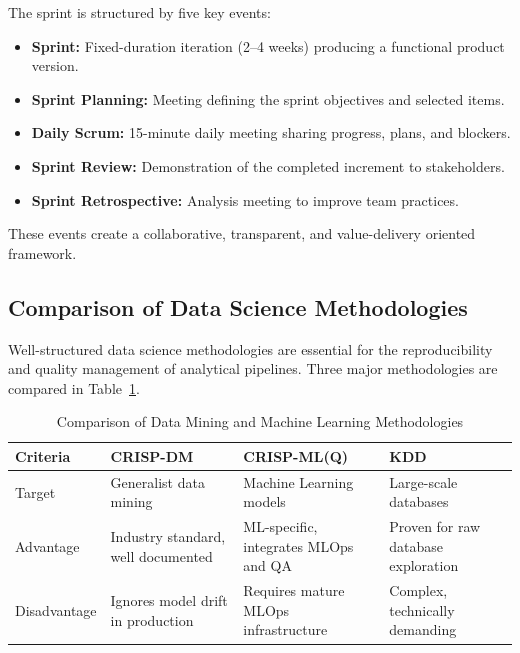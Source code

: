 The sprint is structured by five key events:

\begin{itemize}
    \item \textbf{Sprint:} Fixed-duration iteration (2--4 weeks) producing a functional
    product version.

    \item \textbf{Sprint Planning:} Meeting defining the sprint objectives and selected items.

    \item \textbf{Daily Scrum:} 15-minute daily meeting sharing progress, plans, and blockers.

    \item \textbf{Sprint Review:} Demonstration of the completed increment to stakeholders.

    \item \textbf{Sprint Retrospective:} Analysis meeting to improve team practices.
\end{itemize}

These events create a collaborative, transparent, and value-delivery oriented framework.

\subsection{Comparison of Data Science Methodologies}

Well-structured data science methodologies are essential for the reproducibility and quality
management of analytical pipelines. Three major methodologies are compared in
Table~\ref{tab:comparaison_data_sciences}.

\begin{table}[H]
\small
\centering
\caption{Comparison of Data Mining and Machine Learning Methodologies}
\label{tab:comparaison_data_sciences}
\renewcommand{\arraystretch}{1.4}
\begin{tabular}{|p{2.5cm}|p{3.5cm}|p{3.5cm}|p{4cm}|}
\hline
\rowcolor{blue!15}
\textbf{Criteria} & \textbf{CRISP-DM} & \textbf{CRISP-ML(Q)} & \textbf{KDD} \\
\hline
Target & Generalist data mining & Machine Learning models & Large-scale databases \\
\hline
Advantage & Industry standard, well documented & ML-specific, integrates MLOps and QA & Proven for raw database exploration \\
\hline
Disadvantage & Ignores model drift in production & Requires mature MLOps infrastructure & Complex, technically demanding \\
\hline
\end{tabular}
\end{table}

